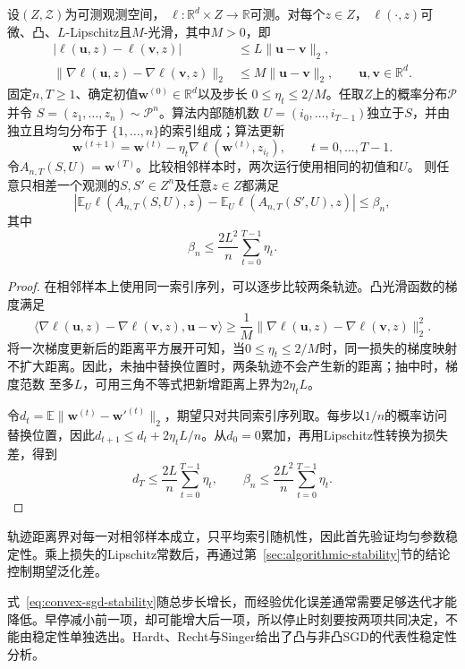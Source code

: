\begin{theorem}[凸光滑SGD的稳定性]
\label{thm:convex-sgd-stability}
设$(Z,\mathcal Z)$为可测观测空间，
$\ell:\mathbb R^d\times Z\to\mathbb R$可测。对每个$z\in Z$，
$\ell(\cdot,z)$可微、凸、$L$-Lipschitz且$M$-光滑，其中$M>0$，即
\[
\begin{aligned}
 |\ell(\bm u,z)-\ell(\bm v,z)|
 &\leq L\|\bm u-\bm v\|_2,\\
 \|\nabla\ell(\bm u,z)-\nabla\ell(\bm v,z)\|_2
 &\leq M\|\bm u-\bm v\|_2,
 \qquad \bm u,\bm v\in\mathbb R^d.
\end{aligned}
\]
固定$n,T\geq1$、确定初值$\bm w^{(0)}\in\mathbb R^d$以及步长
$0\leq\eta_t\leq2/M$。任取$Z$上的概率分布$\mathcal P$并令
$S=(z_1,\ldots,z_n)\sim\mathcal P^n$。算法内部随机数
$U=(i_0,\ldots,i_{T-1})$独立于$S$，并由独立且均匀分布于
$\{1,\ldots,n\}$的索引组成；算法更新
\[
 \bm w^{(t+1)}
 =\bm w^{(t)}-\eta_t\nabla\ell(\bm w^{(t)},z_{i_t}),
 \qquad t=0,\ldots,T-1.
\]
令$A_{n,T}(S,U)=\bm w^{(T)}$。比较相邻样本时，两次运行使用相同的初值和$U$。
则任意只相差一个观测的$S,S'\in Z^n$及任意$z\in Z$都满足
\[
 \left|\mathbb E_U\ell(A_{n,T}(S,U),z)
 -\mathbb E_U\ell(A_{n,T}(S',U),z)\right|\leq\beta_n,
\]
其中
\[
 \beta_n\leq\frac{2L^2}{n}\sum_{t=0}^{T-1}\eta_t.
\]
\end{theorem}
\begin{proof}
在相邻样本上使用同一索引序列，可以逐步比较两条轨迹。凸光滑函数的梯度满足
\[
 \langle\nabla\ell(\bm u,z)-\nabla\ell(\bm v,z),\bm u-\bm v\rangle
 \geq\frac1M\|\nabla\ell(\bm u,z)-\nabla\ell(\bm v,z)\|_2^2.
\]
将一次梯度更新后的距离平方展开可知，当$0\leq\eta_t\leq2/M$时，同一损失的梯度映射
不扩大距离。因此，未抽中替换位置时，两条轨迹不会产生新的距离；抽中时，梯度范数
至多$L$，可用三角不等式把新增距离上界为$2\eta_tL$。

令$d_t=\mathbb E\|\bm w^{(t)}-\bm w'^{(t)}\|_2$，期望只对共同索引序列取。每步以$1/n$的概率访问替换位置，因此$d_{t+1}\leq d_t+2\eta_tL/n$。从$d_0=0$累加，再用Lipschitz性转换为损失差，得到
\begin{equation}
 d_T\leq\frac{2L}{n}\sum_{t=0}^{T-1}\eta_t,
 \qquad
 \beta_n\leq\frac{2L^2}{n}\sum_{t=0}^{T-1}\eta_t.
 \label{eq:convex-sgd-stability}
\end{equation}
\end{proof}

轨迹距离界对每一对相邻样本成立，只平均索引随机性，因此首先验证均匀参数稳定性。乘上损失的Lipschitz常数后，再通过第~\ref{sec:algorithmic-stability}节的结论控制期望泛化差。

式~\eqref{eq:convex-sgd-stability}随总步长增长，而经验优化误差通常需要足够迭代才能降低。早停减小前一项，却可能增大后一项，所以停止时刻要按两项共同决定，不能由稳定性单独选出。Hardt、Recht与Singer给出了凸与非凸SGD的代表性稳定性分析。


